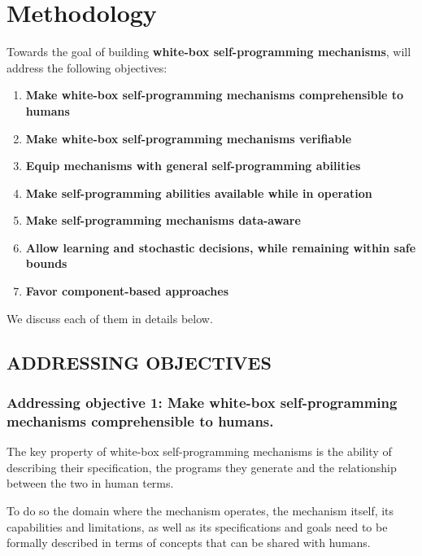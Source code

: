 \section{Methodology}


Towards the goal of building \textbf{white-box self-programming mechanisms}, \project will address the following objectives: %
\begin{enumerate}

\item \textbf{Make white-box self-programming mechanisms comprehensible to
    humans} 

\item \textbf{Make white-box self-programming mechanisms verifiable}

\item \textbf{Equip mechanisms with general self-programming abilities}

\item \textbf{Make self-programming abilities available while in operation} 

\item \textbf{Make self-programming mechanisms data-aware}


\item 
\textbf{Allow learning and stochastic decisions, while remaining within safe bounds}

\item \textbf{Favor component-based approaches}  
\end{enumerate}

We discuss each of them in details below.

\subsection{ADDRESSING OBJECTIVES}


\subsubsection{Addressing objective 1: Make white-box self-programming mechanisms
  comprehensible to humans.}

The key property of white-box self-programming mechanisms is the
ability of describing their specification, the programs they generate
and the relationship between the two in human terms.

To do so the domain where the mechanism operates, the 
mechanism itself, its capabilities and limitations, as well as
its specifications and goals need to be formally described in terms of concepts that
can be shared with humans.

